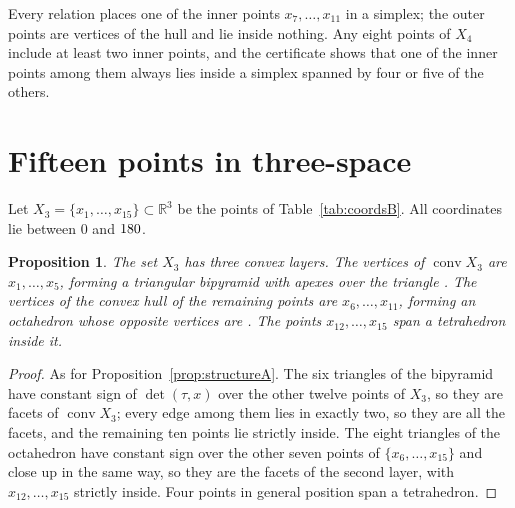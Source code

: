 \documentclass[aps,prd,twocolumn,superscriptaddress,nofootinbib,longbibliography,floatfix,showkeys,amsmath,amssymb,10pt]{revtex4-2}
\theoremstyle{plain}
\newtheorem{proposition}[theorem]{Proposition}
\theoremstyle{definition}
\theoremstyle{plain}
\newcommand{\R}{\mathbb{R}}
\newcommand{\conv}{\operatorname{conv}}
\begin{document}
Every relation places one of the inner points $x_7,\dots,x_{11}$ in a simplex; the outer points are vertices of the hull and lie inside nothing. Any eight points of $X_4$ include at least two inner points, and the certificate shows that one of the inner points among them always lies inside a simplex spanned by four or five of the others.

\section{Fifteen points in three-space}\label{sec:B}

Let $X_3=\{x_1,\dots,x_{15}\}\subset\R^3$ be the points of Table~\ref{tab:coordsB}. All coordinates lie between $0$ and $180$.



\begin{proposition}\label{prop:structureB}
The set $X_3$ has three convex layers. The vertices of $\conv X_3$ are $x_1,\dots,x_5$, forming a triangular bipyramid with apexes \LAYERONEAPEX{} over the triangle \LAYERONEBASE. The vertices of the convex hull of the remaining points are $x_6,\dots,x_{11}$, forming an octahedron whose opposite vertices are \LAYERTWOPAIRS. The points $x_{12},\dots,x_{15}$ span a tetrahedron inside it.
\end{proposition}

\begin{proof}
As for Proposition~\ref{prop:structureA}. The six triangles of the bipyramid have constant sign of $\det(\tau,x)$ over the other twelve points of $X_3$, so they are facets of $\conv X_3$; every edge among them lies in exactly two, so they are all the facets, and the remaining ten points lie strictly inside. The eight triangles of the octahedron have constant sign over the other seven points of $\{x_6,\dots,x_{15}\}$ and close up in the same way, so they are the facets of the second layer, with $x_{12},\dots,x_{15}$ strictly inside. Four points in general position span a tetrahedron.
\end{proof}
\end{document}
